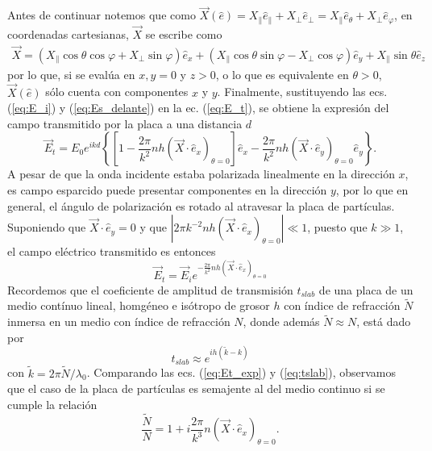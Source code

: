 \documentclass[letterpaper, 12pt] {article}
\begin{document}
Antes de continuar notemos que como $\vec{X}(\hat{e}) = X_{\parallel} \hat{e}_{\parallel} + X_{\perp} \hat{e}_{\perp} = X_{\parallel} \hat{e}_{\theta} + X_{\perp} \hat{e}_{\varphi}$, en coordenadas cartesianas, $\vec{X}$ se escribe como
\begin{align}
\vec{X}	= ( X_{\parallel}\cos\theta\cos\varphi + X_\perp \sin\varphi)\hat{e}_x
			 + ( X_{\parallel}\cos\theta\sin\varphi - X_\perp \cos\varphi)\hat{e}_y
			 + X_\parallel \sin\theta \hat{e}_z \label{eq:X}
\end{align}
por lo que, si se evalúa en  $x,y=0$ y $z>0$, o lo que es equivalente en $\theta>0$, $\vec{X}(\hat{e})$ sólo cuenta con componentes $x$ y $y$. Finalmente, sustituyendo las ecs. (\ref{eq:E_i}) y (\ref{eq:Es_delante}) en la ec. (\ref{eq:E_t}), se obtiene la expresión del campo transmitido por la placa a una distancia $d$
\begin{equation}
\vec{E}_t = E_0 e^{ikd} \left\{\left[1-\frac{2\pi}{k^2}nh (\vec{X}\cdot\hat{e}_x)_{\theta=0} \right]\hat{e}_x - \frac{2\pi}{k^2} nh  (\vec{X}\cdot\hat{e}_y)_{\theta=0}\hat{e}_y    \right\}. 
\end{equation}
A pesar de que la onda incidente estaba polarizada linealmente en la dirección $x$, es campo esparcido puede presentar componentes en la dirección $y$, por lo que en general, el ángulo de polarización es rotado al atravesar la placa de partículas. Suponiendo que $\vec{X}\cdot\hat{e}_y = 0$ y que $|2\pi k^{-2} nh (\vec{X}\cdot\hat{e}_x)_{\theta=0}|\ll 1$, puesto que $k\gg 1$, el campo eléctrico transmitido es entonces
\begin{equation}
\vec{E}_t = \vec{E}_i e^{-\frac{2\pi}{k^2}nh (\vec{X}\cdot\hat{e}_x)_{\theta=0}} \label{eq:Et_exp}
\end{equation}
Recordemos que el coeficiente de amplitud de transmisión $t_{slab}$ de una placa de un medio contínuo lineal, homgéneo e isótropo de grosor $h$ con índice de refracción $\tilde{N}$ inmersa en un medio con índice de refracción $N$, donde además $\tilde{N}\approx N$, está dado por
\begin{equation}
t_{slab} \approx e^{ih (\tilde{k}- k)} \label{eq:tslab}
\end{equation}
con $\tilde{k} = 2\pi \tilde{N}/\lambda_0$. Comparando las ecs. (\ref{eq:Et_exp}) y (\ref{eq:tslab}), observamos que el caso de la placa de partículas es semajente al del medio continuo si se cumple la relación
\begin{equation}
\frac{\tilde{N}}{N}= 1 +i \frac{2\pi}{k^3}n (\vec{X}\cdot\hat{e}_x)_{\theta=0}.\label{eq:ÑN}
\end{equation}
\end{document}
